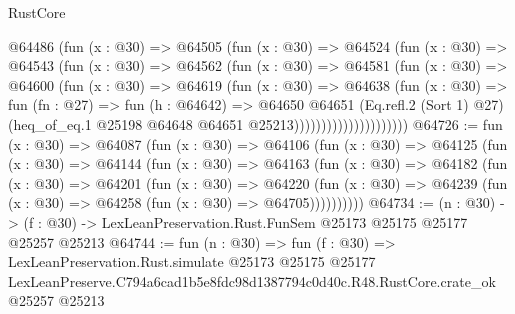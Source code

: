 \begin{lexlean}{RustCore}
\begin{coremodule}
                        @64486
                          (fun (x : @30) =>
                          @64505
                            (fun (x : @30) =>
                            @64524
                              (fun (x : @30) =>
                              @64543
                                (fun (x : @30) =>
                                @64562
                                  (fun (x : @30) =>
                                  @64581
                                    (fun (x : @30) =>
                                    @64600
                                      (fun (x : @30) =>
                                      @64619
                                        (fun (x : @30) =>
                                        @64638
                                          (fun (x : @30) =>
                                          fun (fn : @27) =>
                                          fun (h : @64642) =>
                                          @64650
                                            @64651
                                            (Eq.refl.{2} (Sort 1) @27)
                                            (heq_of_eq.{1}
                                              @25198
                                              @64648
                                              @64651
                                              @25213)))))))))))))))))))))
@64726 := fun (x : @30) =>
  @64087
    (fun (x : @30) =>
    @64106
      (fun (x : @30) =>
      @64125
        (fun (x : @30) =>
        @64144
          (fun (x : @30) =>
          @64163
            (fun (x : @30) =>
            @64182
              (fun (x : @30) =>
              @64201
                (fun (x : @30) =>
                @64220
                  (fun (x : @30) =>
                  @64239 (fun (x : @30) => @64258 (fun (x : @30) => @64705))))))))))
@64734 := (n : @30) ->
  (f : @30) -> LexLeanPreservation.Rust.FunSem @25173 @25175 @25177 @25257 @25213
@64744 := fun (n : @30) =>
  fun (f : @30) =>
  LexLeanPreservation.Rust.simulate
    @25173
    @25175
    @25177
    LexLeanPreserve.C794a6cad1b5e8fdc98d1387794c0d40c.R48.RustCore.crate_ok
    @25257
    @25213
\end{coremodule}
\end{lexlean}
